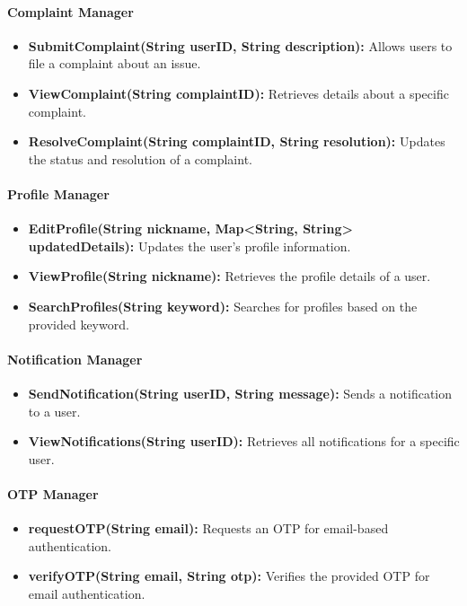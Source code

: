 \paragraph{Complaint Manager}
\begin{itemize}
    \item \textbf{SubmitComplaint(String userID, String description):} Allows users to file a complaint about an issue.
    \item \textbf{ViewComplaint(String complaintID):} Retrieves details about a specific complaint.
    \item \textbf{ResolveComplaint(String complaintID, String resolution):} Updates the status and resolution of a complaint.
\end{itemize}

\paragraph{Profile Manager}
\begin{itemize}
    \item \textbf{EditProfile(String nickname, Map<String, String> updatedDetails):} Updates the user’s profile information.
    \item \textbf{ViewProfile(String nickname):} Retrieves the profile details of a user.
    \item \textbf{SearchProfiles(String keyword):} Searches for profiles based on the provided keyword.
\end{itemize}

\paragraph{Notification Manager}
\begin{itemize}
    \item \textbf{SendNotification(String userID, String message):} Sends a notification to a user.
    \item \textbf{ViewNotifications(String userID):} Retrieves all notifications for a specific user.
\end{itemize}

\paragraph{OTP Manager}
\begin{itemize}
    \item \textbf{requestOTP(String email):} Requests an OTP for email-based authentication.
    \item \textbf{verifyOTP(String email, String otp):} Verifies the provided OTP for email authentication.
\end{itemize}

